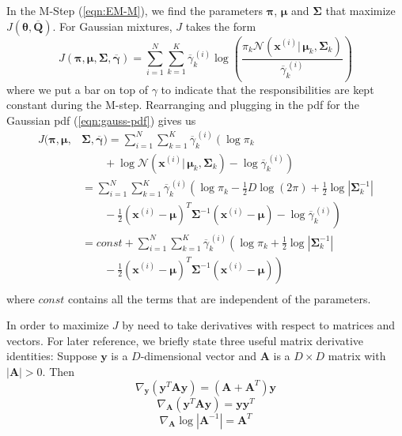 \documentclass[final,3p,times,twocolumn]{elsarticle}
\let\bs\boldsymbol
\let\ol\overline
\begin{document}
In the M-Step (\ref{eqn:EM-M}), we find the parameters $\bs\pi$, $\bs\mu$ and $\bs\Sigma$ that maximize $J(\bs\theta,\ol{\bs Q})$.
For Gaussian mixtures, $J$ takes the form
\begin{equation*}
J(\bs\pi,\bs\mu,\bs\Sigma,\ol{\bs\gamma}) = \sum_{i=1}^N \sum_{k=1}^K \ol\gamma_k^{\,(i)} \log\left(\frac{\pi_k\mathcal{N}(\bs x^{(i)}|\,\bs\mu_k,\bs\Sigma_k)}{\ol\gamma_k^{\,(i)}}\right)
\end{equation*}
where we put a bar on top of $\gamma$ to indicate that the responsibilities are kept constant during the M-step.
Rearranging and plugging in the pdf for the Gaussian pdf (\ref{eqn:gauss-pdf}) gives us
\begin{equation*}
\begin{split}
J(\bs\pi,\bs\mu,&\bs\Sigma,\ol{\bs\gamma}) = \sum_{i=1}^N\sum_{k=1}^K \ol\gamma_k^{\,(i)} \left(\log\pi_k \right.\\
&\left.\qquad+\log\mathcal{N}(\bs x^{(i)}|\,\bs\mu_k,\bs\Sigma_k) - \log\ol\gamma_k^{\,(i)}\right)\\
&= \sum_{i=1}^N\sum_{k=1}^K \ol\gamma_k^{\,(i)} \left(\log\pi_k -\frac{1}{2}D\log(2\pi) + \frac{1}{2}\log|\bs\Sigma_k^{-1}|\right.\\
&\left.\qquad -\frac{1}{2}(\bs x^{(i)}-\bs\mu)^T\bs\Sigma^{-1}(\bs x^{(i)}-\bs\mu) - \log\ol\gamma_k^{\,(i)}\right)\\
&= const + \sum_{i=1}^N\sum_{k=1}^K \ol\gamma_k^{\,(i)} \left(\log\pi_k + \frac{1}{2}\log|\bs\Sigma_k^{-1}|\right.\\
&\left.\qquad -\frac{1}{2}(\bs x^{(i)}-\bs\mu)^T\bs\Sigma^{-1}(\bs x^{(i)}-\bs\mu)\right)\\
\end{split}
\end{equation*}
where $const$ contains all the terms that are independent of the parameters.

In order to maximize $J$ by need to take derivatives with respect to matrices and vectors.
For later reference, we briefly state three useful matrix derivative identities:
Suppose $\bs y$ is a $D$-dimensional vector and $\bs A$ is a $D\times D$ matrix with $|\bs A| > 0$.
Then
\begin{equation}
\label{eqn:derivative1}
\nabla_{\bs y} (\bs y^T \bs A \bs y) = (\bs A + \bs A^T)\bs y
\end{equation}
\begin{equation}
\label{eqn:derivative2}
\nabla_{\bs A} (\bs y^T \bs A \bs y) = \bs y \bs y^T
\end{equation}
\begin{equation}
\label{eqn:derivative3}
\nabla_{\bs A} \log\left|\bs A^{-1}\right| = \bs A^T
\end{equation}
\end{document}
